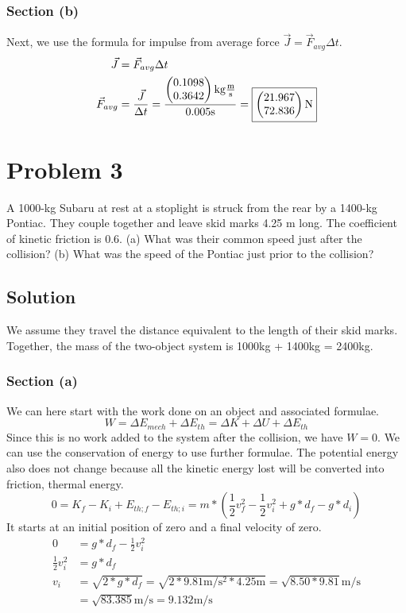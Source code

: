\documentclass[12pt]{article}
\begin{document}
\subsubsection*{Section (b)}
Next, we use the formula for impulse from average force $\vec{J} = \vec{F}_{avg}\Delta t$.
\begin{align*}
    \vec{J} &=  \vec{F}_{avg}\Delta t\\
    \vec{F}_{avg}   &=  \frac{\vec{J}}{\Delta t}
        =   \frac{\begin{pmatrix} 0.1098 \\ 0.3642 \end{pmatrix} \unit{\kilo\gram\frac{\meter}{\second}}}{0.005 \unit{\second}}
        =   \boxed{ \begin{pmatrix} 21.967 \\ 72.836 \end{pmatrix} \unit{\newton} }
\end{align*}


\pagebreak
\section*{Problem 3}
A 1000-kg Subaru at rest at a stoplight is struck from the rear by a 1400-kg Pontiac. They couple together and leave skid marks 4.25 m long. The coefficient of kinetic friction is 0.6. (a) What was their common speed just after the collision? (b) What was the speed of the Pontiac just prior to the collision?

\subsection*{Solution}
We assume they travel the distance equivalent to the length of their skid marks. Together, the mass of the two-object system is 1000kg + 1400kg = 2400kg. 
\subsubsection*{Section (a)}
We can here start with the work done on an object and associated formulae.
\[ W = \Delta E_{mech} + \Delta E_{th} = \Delta K + \Delta U + \Delta E_{th} \]
Since this is no work added to the system after the collision, we have $W = 0$. We can use the conservation of energy to use further formulae. The potential energy also does not change because all the kinetic energy lost will be converted into friction, thermal energy.
\[ 0 = K_f - K_i + E_{th;f} - E_{th;i} = m*\left( \frac{1}{2}v_f^2 - \frac{1}{2}v_i^2 + g*d_f - g*d_i \right) \]
It starts at an initial position of zero and a final velocity of zero.
\begin{align*}
    0   &=  g*d_f - \frac{1}{2}v_i^2\\
    \frac{1}{2}v_i^2    &=  g*d_f\\
    v_i &=  \sqrt{2*g*d_f}
        =   \sqrt{2*9.81\unit{\meter/\second^2}*4.25\unit{\meter}}
        =   \sqrt{8.50*9.81} \unit{\meter/\second}\\
        &=  \sqrt{83.385}\unit{\meter/\second}
        =   \boxed{9.132\unit{\meter/\second}}
\end{align*}
\pagebreak
\end{document}
